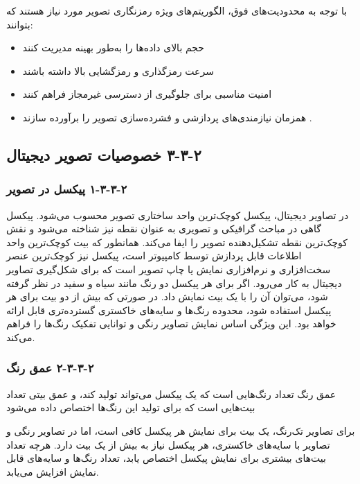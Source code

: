 با توجه به محدودیت‌های فوق، الگوریتم‌های ویژه رمزنگاری تصویر مورد نیاز هستند که بتوانند:

\begin{itemize}
    \item حجم بالای داده‌ها را به‌طور بهینه مدیریت کنند
    \item سرعت رمزگذاری و رمزگشایی بالا داشته باشند
    \item امنیت مناسبی برای جلوگیری از دسترسی غیرمجاز فراهم کنند
    \item همزمان نیازمندی‌های پردازشی و فشرده‌سازی تصویر را برآورده سازند \cite{ref41}.
\end{itemize}

\subsection{‏۲‏-‏۳‏-‏۳‏ خصوصیات تصویر دیجیتال}

\subsubsection{‏۲‏-‏۳‏-‏۳‏-‏۱‏ پیکسل در تصویر}

در تصاویر دیجیتال، پیکسل کوچک‌ترین واحد ساختاری تصویر محسوب می‌شود. پیکسل گاهی در مباحث گرافیکی و تصویری به عنوان نقطه نیز شناخته می‌شود و نقش کوچک‌ترین نقطه تشکیل‌دهنده تصویر را ایفا می‌کند. همانطور که بیت کوچک‌ترین واحد اطلاعات قابل پردازش توسط کامپیوتر است، پیکسل نیز کوچک‌ترین عنصر سخت‌افزاری و نرم‌افزاری نمایش یا چاپ تصویر است که برای شکل‌گیری تصاویر دیجیتال به کار می‌رود. اگر برای هر پیکسل دو رنگ مانند سیاه و سفید در نظر گرفته شود، می‌توان آن را با یک بیت نمایش داد. در صورتی که بیش از دو بیت برای هر پیکسل استفاده شود، محدوده رنگ‌ها و سایه‌های خاکستری گسترده‌تری قابل ارائه خواهد بود. این ویژگی اساس نمایش تصاویر رنگی و توانایی تفکیک رنگ‌ها را فراهم می‌کند\cite{ref42}.

\subsubsection{‏۲‏-‏۳‏-‏۳‏-‏۲‏ عمق رنگ}

عمق رنگ تعداد رنگ‌هایی است که یک پیکسل می‌تواند تولید کند، و عمق بیتی تعداد بیت‌هایی است که برای تولید این رنگ‌ها اختصاص داده می‌شود

برای تصاویر تک‌رنگ، یک بیت برای نمایش هر پیکسل کافی است، اما در تصاویر رنگی و تصاویر با سایه‌های خاکستری، هر پیکسل نیاز به بیش از یک بیت دارد. هرچه تعداد بیت‌های بیشتری برای نمایش پیکسل اختصاص یابد، تعداد رنگ‌ها و سایه‌های قابل نمایش افزایش می‌یابد\cite{ref42}.

